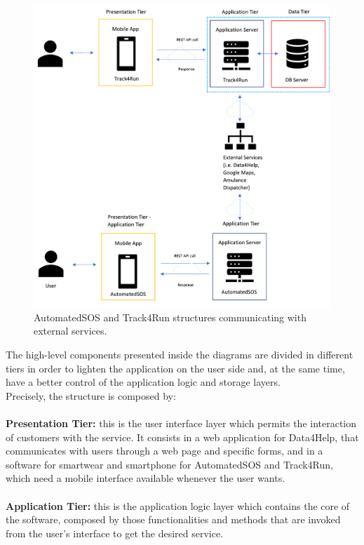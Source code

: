 \documentclass[a4paper]{article}
\begin{document}
\begin{figure}[H]
    \centering
    \includegraphics[width=\linewidth]{architecturalDesign-automated-track}
    \caption{AutomatedSOS and Track4Run structures communicating with external services.}
    \label{fig:my_label}
\end{figure}
The high-level components presented inside the diagrams are divided in different tiers in order to lighten the application on the user side and, at the same time, have a better control of the application logic and storage layers.\\
Precisely, the structure is composed by:\\ \\
\textbf{Presentation Tier:} this is the user interface layer which permits the interaction of customers with the service. It consists in a web application for Data4Help, that communicates with users through a web page and specific forms, and in a software for smartwear and smartphone for AutomatedSOS and Track4Run, which need a mobile interface available whenever the user wants.\\ \\
\textbf{Application Tier:} this is the application logic layer which contains the core of the software, composed by those functionalities and methods that are invoked from the user's interface to get the desired service.\\
\end{document}
